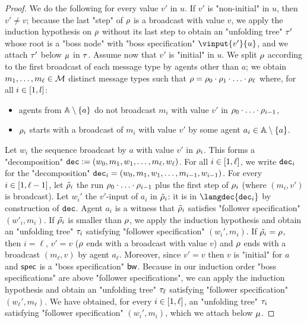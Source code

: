 \begin{proof}
	We do the following for every value $v'$ in $u$.
	If $v'$ is "non-initial" in $u$, then $v' \ne v$; because the last "step" of $\rho$ is a broadcast with value $v$, we apply the induction hypothesis on $\rho$ without its last step to obtain an "unfolding tree" $\tau'$ whose root is a "boss node" with "boss specification" $\vinput{v'}{u}$, and we attach $\tau'$ below $\mu$ in $\tau$.
	Assume now that $v'$ is "initial" in $u$. We split $\rho$ according to the first broadcast of each message type by agents other than $a$; we obtain $m_1, \dots, m_\ell \in \mathcal{M}$ distinct message types such that $\rho = \rho_0 \cdot \rho_1 \cdot \ldots \cdot \rho_\ell$ where, for all $i \in [1,l]$:
	\begin{itemize}
	\item agents from $\mathbb{A} \setminus \{a\}$ do not broadcast $m_i$ with value $v'$ in $\rho_0 \cdot \ldots \cdot \rho_{i-1}$,
	\item $\rho_i$ starts with a broadcast of $m_i$ with value $v'$ by some agent $a_i \in \mathbb{A} \setminus \{a\}$.
	\end{itemize} 
	
	Let $w_i$ the sequence broadcast by $a$ with value $v'$ in $\rho_i$. This forms a "decomposition" $\mathtt{dec} := (w_0, m_1, w_1, \ldots, m_\ell, w_\ell)$.
	For all $i \in [1,\ell]$, we write $\mathtt{dec}_i$ for the "decomposition" $\mathtt{dec}_i = (w_0, m_1, w_1, \ldots, m_{i-1}, w_{i-1})$. 
	For every $i \in [1,\ell-1]$, let $\tilde{\rho}_i$ the run $\rho_0 \cdot \ldots \cdot \rho_{i-1}$ plus the first step of $\rho_i$ (where $(m_i,v')$ is broadcast).
	Let $w_i'$ the $v'$-input of $a_i$ in $\tilde{\rho}_i$: it is in $\langdec{\decsymb_i}$ by construction of $\mathtt{dec}$. Agent $a_i$ is a witness that $\tilde{\rho}_i$ satisfies "follower specification" $(w'_i, m_i)$. 
	If $\tilde{\rho_i}$ is smaller than $\rho$, we apply the induction hypothesis and obtain an "unfolding tree" $\tau_i$ satisfying "follower specification" $(w_i', m_i)$. If $\tilde{\rho_i} = \rho$, then $i = \ell$, $v'=v$ ($\rho$ ends with a broadcast with value $v$) and $\rho$ ends with a broadcast $(m_\ell,v)$ by agent $a_\ell$. Moreover, since $v'=v$ then $v$ is "initial" for $a$ and $\mathsf{spec}$ is a "boss specification" $\mathsf{bw}$. Because in our induction order "boss specifications" are above "follower specifications", we can apply the induction hypothesis and obtain an "unfolding tree" $\tau_\ell$ satisfying "follower specification" $(w_\ell', m_\ell)$. We have obtained, for every $i \in [1,\ell]$, an "unfolding tree" $\tau_i$ satisfying "follower specification" $(w_i', m_i)$, which we attach below $\mu$. 
	

\end{proof}
